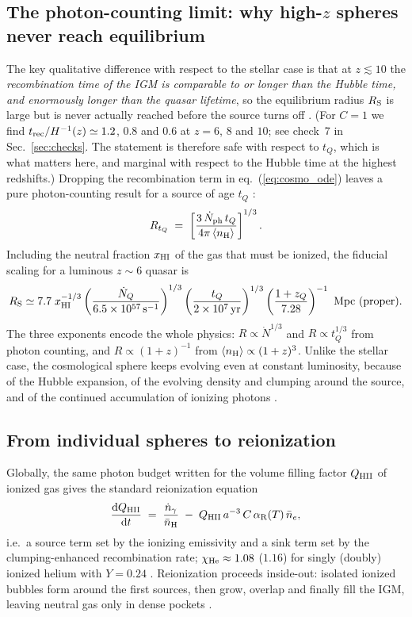 \documentclass[11pt,a4paper]{article}
\newcommand{\nH}{n_{\rm H}}
\begin{document}
\subsection{The photon-counting limit: why high-$z$ spheres never reach equilibrium}
The key qualitative difference with respect to the stellar case is that at $z\lesssim10$ the
\emph{recombination time of the IGM is comparable to or longer than the Hubble time, and enormously
longer than the quasar lifetime}, so the equilibrium radius $R_{\rm S}$ is large but is never
actually reached before the source turns off \citep{Cen2000}. (For $C=1$ we find
$t_{\rm rec}/H^{-1}(z)\simeq1.2$, $0.8$ and $0.6$ at $z=6$, $8$ and $10$; see check~7 in
Sec.~\ref{sec:checks}. The statement is therefore safe with respect to $t_Q$, which is what matters
here, and marginal with respect to the Hubble time at the highest redshifts.) Dropping the recombination term in eq.~(\ref{eq:cosmo_ode}) leaves a pure
photon-counting result for a source of age $t_Q$ \citep[eq.~2]{Cen2000}:
\begin{equation}
  R_{t_Q} \;=\; \left[\frac{3\,\dot N_{\rm ph}\,t_Q}{4\pi\,\langle \nH\rangle}\right]^{1/3}.
  \label{eq:photon_counting}
\end{equation}
Including the neutral fraction $x_{\rm HI}$ of the gas that must be ionized, the fiducial scaling for
a luminous $z\sim6$ quasar is \citep{Mesinger2004}
\begin{equation}
  R_{\rm S}\simeq 7.7\;
  x_{\rm HI}^{-1/3}
  \left(\frac{\dot N_Q}{6.5\times10^{57}\,{\rm s^{-1}}}\right)^{1/3}
  \left(\frac{t_Q}{2\times10^{7}\,{\rm yr}}\right)^{1/3}
  \left(\frac{1+z_Q}{7.28}\right)^{-1}\ {\rm Mpc\ (proper)}.
  \label{eq:mesinger}
\end{equation}
The three exponents encode the whole physics: $R\propto \dot N^{1/3}$ and $R\propto t_Q^{1/3}$ from
photon counting, and $R\propto(1+z)^{-1}$ from $\langle \nH\rangle\propto(1+z)^3$. Unlike the stellar
case, the cosmological sphere keeps evolving even at constant luminosity, because of the Hubble
expansion, of the evolving density and clumping around the source, and of the continued accumulation
of ionizing photons \citep{Cen2000}.

\subsection{From individual spheres to reionization}
Globally, the same photon budget written for the volume filling factor $Q_{\rm HII}$ of ionized gas
gives the standard reionization equation \citep[eq.~66]{Choudhury2022}
\begin{equation}
  \frac{{\rm d}Q_{\rm HII}}{{\rm d}t}
  \;=\; \frac{\dot n_\gamma}{\bar n_{\rm H}}
  \;-\; Q_{\rm HII}\,a^{-3}\,C\,\alpha_{\rm R}(T)\,\bar n_e ,
  \label{eq:QHII}
\end{equation}
i.e.\ a source term set by the ionizing emissivity and a sink term set by the clumping-enhanced
recombination rate; $\chi_{\rm He}\approx1.08$ ($1.16$) for singly (doubly) ionized helium with
$Y=0.24$ \citep{Choudhury2022}. Reionization proceeds inside-out: isolated ionized bubbles form
around the first sources, then grow, overlap and finally fill the IGM, leaving neutral gas only in
dense pockets \citep{Chakraborty2025,Cen2000}.
\end{document}
